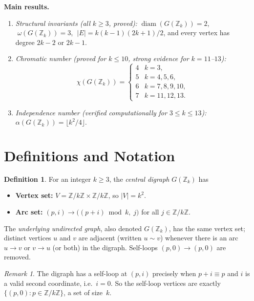 \documentclass[12pt]{article}
\theoremstyle{definition}
\newtheorem{definition}[theorem]{Definition}
\theoremstyle{remark}
\newtheorem{remark}[theorem]{Remark}
\newcommand{\Z}{\mathbb{Z}}
\newcommand{\Zk}{\Z/k\Z}
\newcommand{\GZk}{G(\Z_k)}
\begin{document}
\medskip
\noindent\textbf{Main results.}
\begin{enumerate}[label=(\roman*)]
  \item \emph{Structural invariants (all $k \ge 3$, proved):}
    $\operatorname{diam}(\GZk) = 2$, $\;\omega(\GZk) = 3$,
    $\;|E| = k(k-1)(2k+1)/2$, and every vertex has degree $2k-2$ or $2k-1$.
  \item \emph{Chromatic number (proved for $k \le 10$, strong evidence for
    $k = 11$--$13$):}
    \[
      \chi(\GZk) =
      \begin{cases}
        4 & k = 3,\\
        5 & k = 4, 5, 6,\\
        6 & k = 7, 8, 9, 10,\\
        7 & k = 11, 12, 13.
      \end{cases}
    \]
  \item \emph{Independence number (verified computationally for $3 \le k \le 13$):}
    $\alpha(\GZk) = \lfloor k^2/4 \rfloor$.
\end{enumerate}


\section{Definitions and Notation}
\label{sec:defs}

\begin{definition}
\label{def:graph}
For an integer $k \ge 3$, the \emph{central digraph} $\GZk$ has
\begin{itemize}
  \item \textbf{Vertex set:} $V = \Zk \times \Zk$, so $|V| = k^2$.
  \item \textbf{Arc set:} $(p, i) \to \bigl((p+i) \bmod k,\; j\bigr)$
    for all $j \in \Zk$.
\end{itemize}
The \emph{underlying undirected graph}, also denoted $\GZk$, has the same
vertex set; distinct vertices $u$ and $v$ are adjacent (written $u \sim v$)
whenever there is an arc $u \to v$ or $v \to u$ (or both) in the digraph.
Self-loops $(p,0) \to (p,0)$ are removed.
\end{definition}

\begin{remark}
\label{rem:selfloops}
The digraph has a self-loop at $(p, i)$ precisely when $p + i \equiv p$
and $i$ is a valid second coordinate, i.e.\ $i = 0$.  So the self-loop
vertices are exactly $\{(p, 0) : p \in \Zk\}$, a set of size~$k$.
\end{remark}
\end{document}
